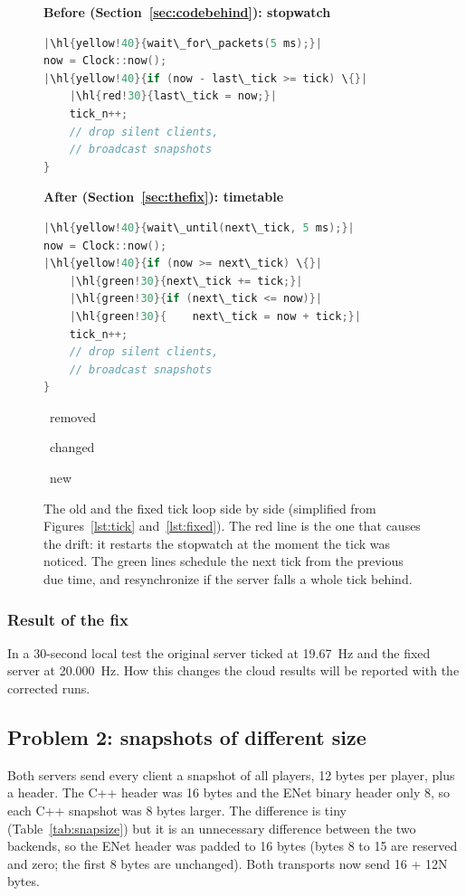 \documentclass[11pt]{article}
\begin{document}
\newcommand{\hl}[2]{\colorbox{#1}{\strut#2}}
\begin{figure}[H]
\centering
\begin{minipage}[t]{0.48\textwidth}
\textbf{\small Before (Section~\ref{sec:codebehind}): stopwatch}\par\smallskip
\begin{lstlisting}[language=C++,basicstyle=\ttfamily\scriptsize,escapechar=|,frame=none]
|\hl{yellow!40}{wait\_for\_packets(5 ms);}|
now = Clock::now();
|\hl{yellow!40}{if (now - last\_tick >= tick) \{}|
    |\hl{red!30}{last\_tick = now;}|
    tick_n++;
    // drop silent clients,
    // broadcast snapshots
}
\end{lstlisting}
\end{minipage}\hfill
\begin{minipage}[t]{0.48\textwidth}
\textbf{\small After (Section~\ref{sec:thefix}): timetable}\par\smallskip
\begin{lstlisting}[language=C++,basicstyle=\ttfamily\scriptsize,escapechar=|,frame=none]
|\hl{yellow!40}{wait\_until(next\_tick, 5 ms);}|
now = Clock::now();
|\hl{yellow!40}{if (now >= next\_tick) \{}|
    |\hl{green!30}{next\_tick += tick;}|
    |\hl{green!30}{if (next\_tick <= now)}|
    |\hl{green!30}{    next\_tick = now + tick;}|
    tick_n++;
    // drop silent clients,
    // broadcast snapshots
}
\end{lstlisting}
\end{minipage}
\par\smallskip
{\small\colorbox{red!30}{\strut~removed~}\quad\colorbox{yellow!40}{\strut~changed~}\quad\colorbox{green!30}{\strut~new~}}
\caption{The old and the fixed tick loop side by side (simplified from Figures~\ref{lst:tick} and~\ref{lst:fixed}). The red line is the one that causes the drift: it restarts the stopwatch at the moment the tick was noticed. The green lines schedule the next tick from the previous due time, and resynchronize if the server falls a whole tick behind.}
\label{lst:diff}
\end{figure}

\subsubsection{Result of the fix}
In a 30-second local test the original server ticked at 19.67~Hz and the fixed server at 20.000~Hz. How this changes the cloud results will be reported with the corrected runs.

\subsection{Problem 2: snapshots of different size}
Both servers send every client a snapshot of all players, 12 bytes per player, plus a header. The C++ header was 16 bytes and the ENet binary header only 8, so each C++ snapshot was 8 bytes larger. The difference is tiny (Table~\ref{tab:snapsize}) but it is an unnecessary difference between the two backends, so the ENet header was padded to 16 bytes (bytes 8 to 15 are reserved and zero; the first 8 bytes are unchanged). Both transports now send 16 + 12N bytes.
\end{document}
